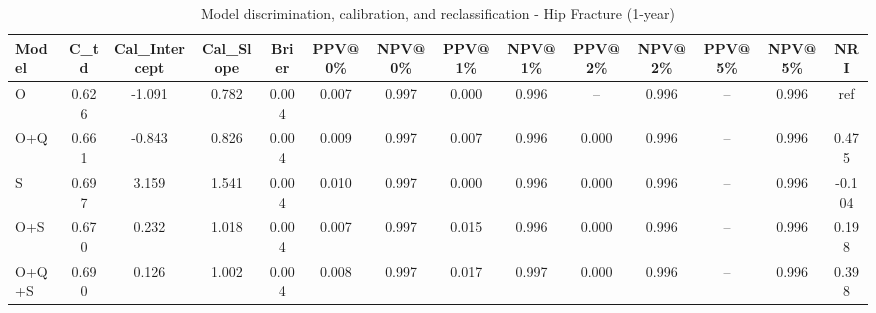 \begin{table}[htbp]
\centering
\small
\caption{Model discrimination, calibration, and reclassification - Hip Fracture (1-year)}
\label{tab:perf_pd_1y}
\begin{tabular}{lccccccccccccc}
\toprule
Model & C\_td & Cal\_Intercept & Cal\_Slope & Brier & PPV@0\% & NPV@0\% & PPV@1\% & NPV@1\% & PPV@2\% & NPV@2\% & PPV@5\% & NPV@5\% & NRI \\
\midrule
O & 0.626 & -1.091 & 0.782 & 0.004 & 0.007 & 0.997 & 0.000 & 0.996 & -- & 0.996 & -- & 0.996 & ref \\
O+Q & 0.661 & -0.843 & 0.826 & 0.004 & 0.009 & 0.997 & 0.007 & 0.996 & 0.000 & 0.996 & -- & 0.996 & 0.475 \\
S & 0.697 & 3.159 & 1.541 & 0.004 & 0.010 & 0.997 & 0.000 & 0.996 & 0.000 & 0.996 & -- & 0.996 & -0.104 \\
O+S & 0.670 & 0.232 & 1.018 & 0.004 & 0.007 & 0.997 & 0.015 & 0.996 & 0.000 & 0.996 & -- & 0.996 & 0.198 \\
O+Q+S & 0.690 & 0.126 & 1.002 & 0.004 & 0.008 & 0.997 & 0.017 & 0.997 & 0.000 & 0.996 & -- & 0.996 & 0.398 \\
\bottomrule
\end{tabular}
\end{table}